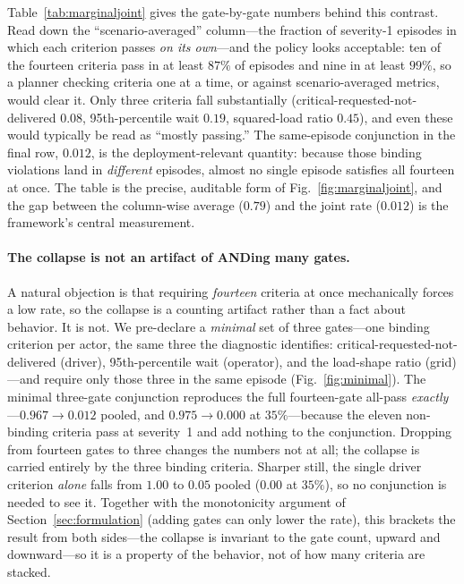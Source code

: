 \documentclass[12pt]{article}
\newcommand{\figref}[1]{Fig.~\ref{#1}}
\newcommand{\tabref}[1]{Table~\ref{#1}}
\begin{document}
\tabref{tab:marginaljoint} gives the gate-by-gate numbers behind this contrast. Read down the ``scenario-averaged'' column---the fraction of severity-1 episodes in which each criterion passes \emph{on its own}---and the policy looks acceptable: ten of the fourteen criteria pass in at least $87\%$ of episodes and nine in at least $99\%$, so a planner checking criteria one at a time, or against scenario-averaged metrics, would clear it. Only three criteria fall substantially (critical-requested-not-delivered $0.08$, 95th-percentile wait $0.19$, squared-load ratio $0.45$), and even these would typically be read as ``mostly passing.'' The same-episode conjunction in the final row, $0.012$, is the deployment-relevant quantity: because those binding violations land in \emph{different} episodes, almost no single episode satisfies all fourteen at once. The table is the precise, auditable form of \figref{fig:marginaljoint}, and the gap between the column-wise average ($0.79$) and the joint rate ($0.012$) is the framework's central measurement.

\paragraph{The collapse is not an artifact of ANDing many gates.} A natural objection is that requiring \emph{fourteen} criteria at once mechanically forces a low rate, so the collapse is a counting artifact rather than a fact about behavior. It is not. We pre-declare a \emph{minimal} set of three gates---one binding criterion per actor, the same three the diagnostic identifies: critical-requested-not-delivered (driver), 95th-percentile wait (operator), and the load-shape ratio (grid)---and require only those three in the same episode (\figref{fig:minimal}). The minimal three-gate conjunction reproduces the full fourteen-gate all-pass \emph{exactly}---$0.967\rightarrow0.012$ pooled, and $0.975\rightarrow0.000$ at $35\%$---because the eleven non-binding criteria pass at severity~1 and add nothing to the conjunction. Dropping from fourteen gates to three changes the numbers not at all; the collapse is carried entirely by the three binding criteria. Sharper still, the single driver criterion \emph{alone} falls from $1.00$ to $0.05$ pooled ($0.00$ at $35\%$), so no conjunction is needed to see it. Together with the monotonicity argument of Section~\ref{sec:formulation} (adding gates can only lower the rate), this brackets the result from both sides---the collapse is invariant to the gate count, upward and downward---so it is a property of the behavior, not of how many criteria are stacked.
\end{document}
